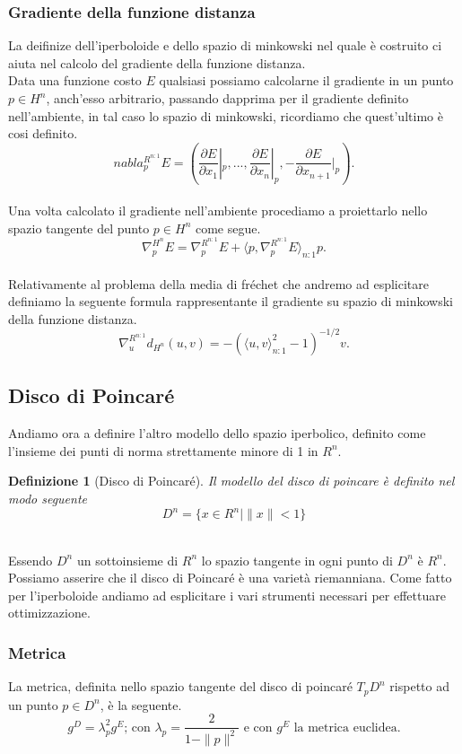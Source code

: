 \documentclass[a4paper, 12pt]{article}
\newtheorem{definition}{Definizione}
\begin{document}
\subsubsection{Gradiente della funzione distanza}
La deifinize dell'iperboloide e dello spazio di minkowski nel quale è costruito ci aiuta nel calcolo del gradiente della funzione distanza.\\
Data una funzione costo $E$ qualsiasi possiamo calcolarne il gradiente in un punto $p \in H^n$, anch'esso arbitrario, passando dapprima per il gradiente definito nell'ambiente, in tal caso lo spazio di minkowski, ricordiamo che quest'ultimo è cosi definito.\\
\[nabla_{p}^{R^{n:1}} E = (\frac{\partial E}{\partial x_1}|_p, ..., \frac{\partial E}{\partial x_n}|_p, -\frac{\partial E}{\partial x_{n+1}}|_p).\]\\
Una volta calcolato il gradiente nell'ambiente procediamo a proiettarlo nello spazio tangente del punto $p \in H^n$ come segue.\\
\[\nabla_{p}^{H^n} E = \nabla_{p}^{R^{n:1}} E + \langle p, \nabla_{p}^{R^{n:1}} E \rangle_{n:1} p.\]\\
Relativamente al problema della media di fréchet che andremo ad esplicitare definiamo la seguente formula rappresentante il gradiente su spazio di minkowski della funzione distanza.\\
\[\nabla_u^{R^{n:1}} d_{H^n}(u,v) = - (\langle u,v \rangle_{n:1}^2 - 1)^{-1/2} v.\]
\subsection{Disco di Poincaré}
Andiamo ora a definire l'altro modello dello spazio iperbolico, definito come l'insieme dei punti di norma strettamente minore di 1 in $R^n$.
\begin{definition}[Disco di Poincaré]
Il modello del disco di poincare è definito nel modo seguente\\
\[ D^n = \{x \in R^n | \parallel x \parallel < 1\} \]\\
\end{definition}
Essendo $D^n$ un sottoinsieme di $R^n$ lo spazio tangente in ogni punto di $D^n$ è $R^n$. Possiamo asserire che il disco di Poincaré è una varietà riemanniana. Come fatto per l'iperboloide andiamo ad esplicitare i vari strumenti necessari per effettuare ottimizzazione.
\subsubsection{Metrica}
La metrica, definita nello spazio tangente del disco di poincaré $T_pD^n$ rispetto ad un punto $p \in D^n$, è la seguente.\\
\[g^D = \lambda_p^2 g^E \mbox{; con } \lambda_p = \frac{2}{1- \parallel p \parallel^2} \mbox{ e con } g^E \mbox{ la metrica euclidea}.\]
\end{document}
